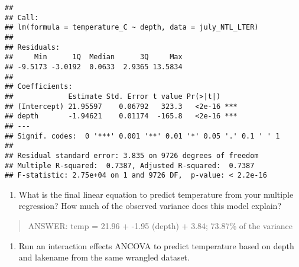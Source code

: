 \documentclass[]{article}
\newenvironment{Shaded}{\begin{snugshade}}{\end{snugshade}}
\newcommand{\KeywordTok}[1]{\textcolor[rgb]{0.13,0.29,0.53}{\textbf{#1}}}
\newcommand{\DataTypeTok}[1]{\textcolor[rgb]{0.13,0.29,0.53}{#1}}
\newcommand{\StringTok}[1]{\textcolor[rgb]{0.31,0.60,0.02}{#1}}
\newcommand{\CommentTok}[1]{\textcolor[rgb]{0.56,0.35,0.01}{\textit{#1}}}
\newcommand{\OperatorTok}[1]{\textcolor[rgb]{0.81,0.36,0.00}{\textbf{#1}}}
\newcommand{\NormalTok}[1]{#1}
\providecommand{\tightlist}{%
  \setlength{\itemsep}{0pt}\setlength{\parskip}{0pt}}
\begin{document}
\begin{verbatim}
## 
## Call:
## lm(formula = temperature_C ~ depth, data = july_NTL_LTER)
## 
## Residuals:
##     Min      1Q  Median      3Q     Max 
## -9.5173 -3.0192  0.0633  2.9365 13.5834 
## 
## Coefficients:
##             Estimate Std. Error t value Pr(>|t|)    
## (Intercept) 21.95597    0.06792   323.3   <2e-16 ***
## depth       -1.94621    0.01174  -165.8   <2e-16 ***
## ---
## Signif. codes:  0 '***' 0.001 '**' 0.01 '*' 0.05 '.' 0.1 ' ' 1
## 
## Residual standard error: 3.835 on 9726 degrees of freedom
## Multiple R-squared:  0.7387, Adjusted R-squared:  0.7387 
## F-statistic: 2.75e+04 on 1 and 9726 DF,  p-value: < 2.2e-16
\end{verbatim}

\begin{enumerate}
\def\labelenumi{\arabic{enumi}.}
\setcounter{enumi}{12}
\tightlist
\item
  What is the final linear equation to predict temperature from your
  multiple regression? How much of the observed variance does this model
  explain?
\end{enumerate}

\begin{quote}
ANSWER: temp = 21.96 + -1.95 (depth) + 3.84; 73.87\% of the variance
\end{quote}

\begin{enumerate}
\def\labelenumi{\arabic{enumi}.}
\setcounter{enumi}{13}
\tightlist
\item
  Run an interaction effects ANCOVA to predict temperature based on
  depth and lakename from the same wrangled dataset.
\end{enumerate}

\begin{Shaded}
\end{Shaded}
\end{document}
